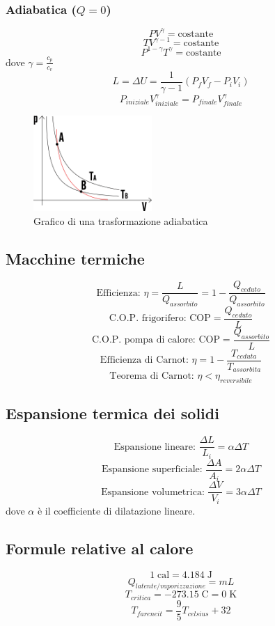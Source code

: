 \documentclass[a4paper]{article}
\theoremstyle{break}
\theoremstyle{break}
\theoremstyle{break}
\theoremstyle{break}
\begin{document}
\subsubsection{Adiabatica (\( Q = 0 \))}
\[
P V^\gamma = \text{costante}
\] 
\[
T V^{\gamma - 1} = \text{costante}
\] 
\[
  P^{1 - \gamma} T^\gamma = \text{costante}
\] 
dove \( \gamma = \frac{c_p}{c_v} \)
\[
L = \Delta U = \frac{1}{\gamma - 1} \left( P_f V_f - P_i V_i \right) 
\] 
\[
  P_{iniziale} V_{iniziale}^\gamma = P_{finale} V_{finale}^\gamma
\] 
\begin{figure}[H]
  \begin{center}
    \includegraphics[width=0.4\textwidth]{adiabatica}
  \end{center}
  \caption{Grafico di una trasformazione adiabatica}
\end{figure}

\subsection{Macchine termiche}
\[
  \text{Efficienza: } \eta = \frac{L}{Q_{assorbito}} = 1 - \frac{Q_{ceduto}}{Q_{assorbito}}
\]
\[
\text{C.O.P. frigorifero: } \text{COP} = \frac{Q_{ceduto}}{L}
\] 
\[
  \text{C.O.P. pompa di calore: } \text{COP} = \frac{Q_{assorbito}}{L}
\] 
\[
\text{Efficienza di Carnot: } \eta = 1 - \frac{T_{ceduta}}{T_{assorbita}}
\] 
\[
  \text{Teorema di Carnot: } \eta < \eta_{reversibile}
\] 
\subsection{Espansione termica dei solidi}
\[
\text{Espansione lineare: } \frac{\Delta L}{L_i} = \alpha \Delta T
\] 
\[
\text{Espansione superficiale: } \frac{\Delta A}{A_i} = 2 \alpha \Delta T
\] 
\[
\text{Espansione volumetrica: } \frac{\Delta V}{V_i} = 3 \alpha \Delta T
\] 
dove \( \alpha \) è il coefficiente di dilatazione lineare.

\subsection{Formule relative al calore}
\[
1\; \text{cal} = 4.184\; \text{J}
\] 
\[
  Q_{latente/vaporizzazione} = mL
\] 
\[
  T_{critica} = -273.15\; \text{C} = 0\; \text{K}
\] 
\[
  T_{fareneit} = \frac{9}{5} T_{celsius} + 32
\] 
\end{document}
